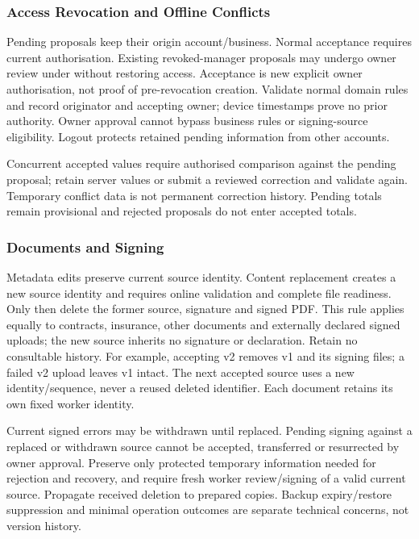 \subsubsection{Access Revocation and Offline Conflicts}
Pending proposals keep their origin account/business. Normal acceptance requires
current authorisation. Existing revoked-manager proposals may undergo owner review
under  without restoring access. Acceptance is new explicit owner
authorisation, not proof of pre-revocation creation. Validate normal domain rules
and record originator and accepting owner; device timestamps prove no prior authority.
Owner approval cannot bypass business rules or signing-source eligibility.
Logout protects retained pending information from other accounts.

Concurrent accepted values require authorised comparison against the pending
proposal; retain server values or submit a reviewed correction and validate again.
Temporary conflict data is not permanent correction history. Pending totals remain
provisional and rejected proposals do not enter accepted totals.


\subsubsection{Documents and Signing}
\label{sec:document-corrections}
Metadata edits preserve current source identity. Content replacement creates a new
source identity and requires online validation and complete file readiness. Only
then delete the former source, signature and signed PDF. This rule applies equally
to contracts, insurance, other documents and externally declared signed uploads;
the new source inherits no signature or declaration. Retain no consultable history.
For example, accepting v2 removes v1 and its signing files; a failed v2 upload
leaves v1 intact. The next accepted source uses a new identity/sequence, never a
reused deleted identifier. Each document retains its own fixed worker identity.

Current signed errors may be withdrawn until replaced. Pending signing against a
replaced or withdrawn source cannot be accepted, transferred or resurrected by owner
approval. Preserve only protected temporary information needed for rejection and
recovery, and require fresh worker review/signing of a valid current source.
Propagate received deletion to prepared copies. Backup expiry/restore suppression
and minimal operation outcomes are separate technical concerns, not version history.

